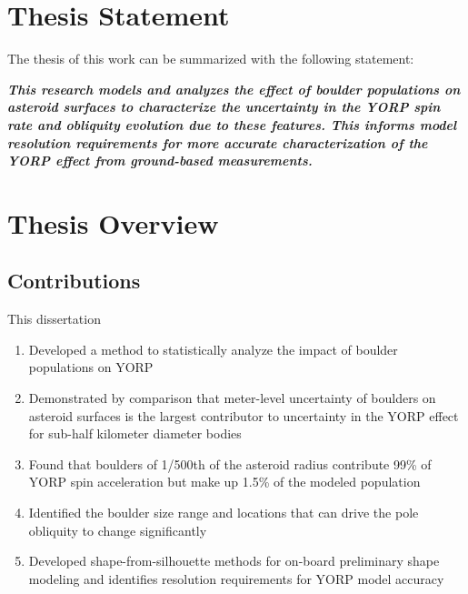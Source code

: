 \section{Thesis Statement}
The thesis of this work can be summarized with the following statement:

\begin{center}
\textbf{\it{This research models and analyzes the effect of boulder populations on asteroid surfaces to characterize the uncertainty in the YORP spin rate and obliquity evolution due to these features. This informs model resolution requirements for more accurate characterization of the YORP effect from ground-based measurements.}}
\end{center}

\section{Thesis Overview}
\subsection{Contributions}
This dissertation
\begin{enumerate}
    \item Developed a method to statistically analyze the impact of boulder populations on YORP
    \item Demonstrated by comparison that meter-level uncertainty of boulders on asteroid surfaces is the largest contributor to uncertainty in the YORP effect for sub-half kilometer diameter bodies
    \item Found that boulders of 1/500th of the asteroid radius contribute 99\% of YORP spin acceleration but make up 1.5\% of the modeled population
    \item Identified the boulder size range and locations that can drive the pole obliquity to change significantly
    \item Developed shape-from-silhouette methods for on-board preliminary shape modeling and identifies resolution requirements for YORP model accuracy
\end{enumerate}


























